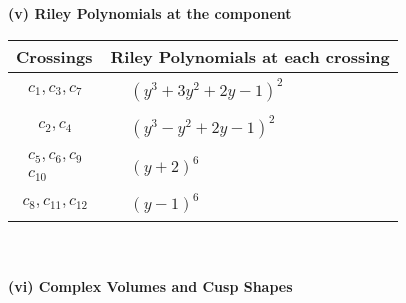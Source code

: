 \documentclass[1p]{elsarticle_modified}
\theoremstyle{definition}
\begin{document}
\newpage\renewcommand{\arraystretch}{1}
\flushleft \textbf{(v) Riley Polynomials at the component}\newline \\
\begin{tabular}{m{50pt}|m{274pt}}
Crossings & \hspace{64pt}Riley Polynomials at each crossing \\
\hline $$\begin{aligned}c_{1},c_{3},c_{7}\end{aligned}$$&$\begin{aligned}
&(y^3+3 y^2+2 y-1)^2
\end{aligned}$\\
\hline $$\begin{aligned}c_{2},c_{4}\end{aligned}$$&$\begin{aligned}
&(y^3- y^2+2 y-1)^2
\end{aligned}$\\
\hline $$\begin{aligned}c_{5},c_{6},c_{9}\\c_{10}\end{aligned}$$&$\begin{aligned}
&(y+2)^6
\end{aligned}$\\
\hline $$\begin{aligned}c_{8},c_{11},c_{12}\end{aligned}$$&$\begin{aligned}
&(y-1)^6
\end{aligned}$\\
\hline
\end{tabular}\\~\\
\newpage\flushleft \textbf{(vi) Complex Volumes and Cusp Shapes}
\end{document}
